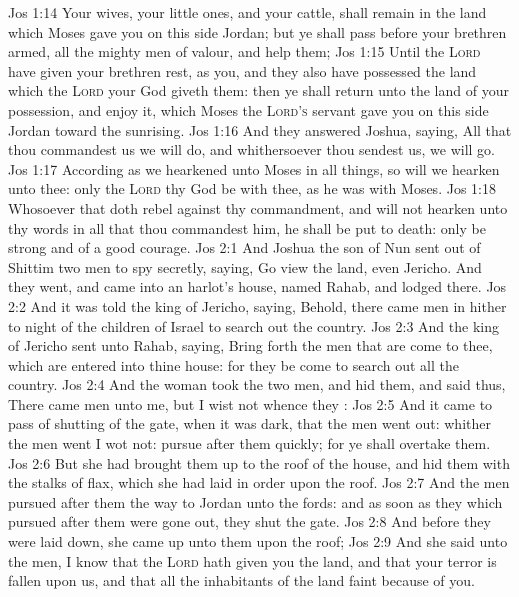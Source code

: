 \vs Jos 1:14 Your wives, your little ones, and your cattle, shall remain in the land which Moses gave you on this side Jordan; but ye shall pass before your brethren armed, all the mighty men of valour, and help them;
\vs Jos 1:15 Until the \textsc{Lord} have given your brethren rest, as  you, and they also have possessed the land which the \textsc{Lord} your God giveth them: then ye shall return unto the land of your possession, and enjoy it, which Moses the \textsc{Lord's} servant gave you on this side Jordan toward the sunrising.
\vs Jos 1:16 And they answered Joshua, saying, All that thou commandest us we will do, and whithersoever thou sendest us, we will go.
\vs Jos 1:17 According as we hearkened unto Moses in all things, so will we hearken unto thee: only the \textsc{Lord} thy God be with thee, as he was with Moses.
\vs Jos 1:18 Whosoever  that doth rebel against thy commandment, and will not hearken unto thy words in all that thou commandest him, he shall be put to death: only be strong and of a good courage.
\vs Jos 2:1 And Joshua the son of Nun sent out of Shittim two men to spy secretly, saying, Go view the land, even Jericho. And they went, and came into an harlot's house, named Rahab, and lodged there.
\vs Jos 2:2 And it was told the king of Jericho, saying, Behold, there came men in hither to night of the children of Israel to search out the country.
\vs Jos 2:3 And the king of Jericho sent unto Rahab, saying, Bring forth the men that are come to thee, which are entered into thine house: for they be come to search out all the country.
\vs Jos 2:4 And the woman took the two men, and hid them, and said thus, There came men unto me, but I wist not whence they :
\vs Jos 2:5 And it came to pass  of shutting of the gate, when it was dark, that the men went out: whither the men went I wot not: pursue after them quickly; for ye shall overtake them.
\vs Jos 2:6 But she had brought them up to the roof of the house, and hid them with the stalks of flax, which she had laid in order upon the roof.
\vs Jos 2:7 And the men pursued after them the way to Jordan unto the fords: and as soon as they which pursued after them were gone out, they shut the gate.
\vs Jos 2:8 And before they were laid down, she came up unto them upon the roof;
\vs Jos 2:9 And she said unto the men, I know that the \textsc{Lord} hath given you the land, and that your terror is fallen upon us, and that all the inhabitants of the land faint because of you.
